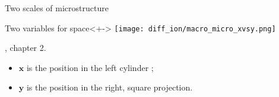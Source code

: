 \begin{frame}{Two scales of microstructure}
%
%
\begin{block}{Two variables for space}<+->
%
\texttt{[image: diff\_ion/macro\_micro\_xvsy.png]}

\par
\cite{th_KhaledB}, chapter 2.
%
\begin{itemize}
\item<+-> $\mathbf{x}$ is the position in the left cylinder ;
\item<+-> $\mathbf{y}$ is the position in the right, square projection.
\end{itemize}
%
\end{block}
%
\end{frame}

